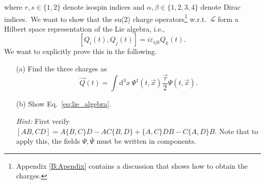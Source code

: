 \documentclass[prd,%
,superscriptaddress,%
nofootinbib,%
tightenlines ]{revtex4}
\newcommand{\dd}{\mathrm{d}}
\begin{document}
where $r,s \in \{1,2\}$ denote isospin indices and $\alpha,\beta \in \{1,2,3,4\}$ denote Dirac indices.~We want to show that the su(2) charge operators\footnote{Appendix \ref{B:Apendix} contains a discussion that shows how to obtain the charges.} w.r.t.\ $\mathcal{L}$ form a Hilbert space representation of the Lie algebra, i.e.,
\begin{equation}
\label{eq:lie_algebra}
[Q_i(t), Q_j(t)] = i \varepsilon_{ijk} Q_k(t) .
\end{equation}
We want to explicitly prove this in the following.

\begin{itemize}
	\item[(a)]
	Find the three charges as
	\begin{equation}
	\vec{Q}(t) = \int \dd^3 x \: \Psi^\dagger(t, \vec x) \frac{\vec\tau}{2} \Psi(t, \vec x) .
	\end{equation}
	
	\item[(b)]
	Show Eq.~\eqref{eq:lie_algebra}.
	
	\textit{Hint:} First verify $[AB,CD] = A \{B,C\} D - A C \{B,D\} + \{A,C\} D B - C \{A,D\} B$. Note that to apply this, the fields $\Psi, \bar\Psi$ must be written in components.
\end{itemize}
\end{document}

